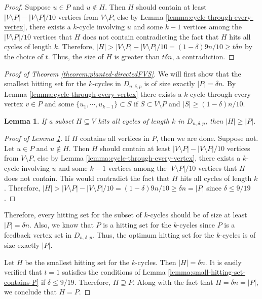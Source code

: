 \documentclass[11pt]{article}
\newtheorem{lemma}[theorem]{Lemma}
\begin{document}
\begin{proof}
Suppose $u\in P$ and $u\not \in H$. Then $H$ should contain at least $|V\setminus P|-|V\setminus P|/10$ vertices from $V\setminus P$, else  by Lemma \ref{lemma:cycle-through-every-vertex}, there exists a $k$-cycle involving $u$ and some $k-1$ vertices among the $|V\setminus P|/10$ vertices that $H$ does not contain contradicting the fact that $H$ hits all cycles of length $k$. Therefore, $|H|>|V\setminus P|-|V\setminus P|/10=(1-\delta)9n/10 \geq t\delta n$ by the choice of $t$. Thus, the size of $H$ is greater than $t\delta n$, a contradiction.
\end{proof}

\begin{proof}[Proof of Theorem \ref{theorem:planted-directedFVS}]
We will first show that the smallest hitting set for the $k$-cycles in $D_{n,\delta,p}$ is of size exactly $|P|=\delta n$.
By Lemma \ref{lemma:cycle-through-every-vertex} there exists a $k$-cycle through every vertex $v\in P$ and some $\{u_1,\cdots,u_{k-1}\}\subset S$ if $S\subset V\setminus P$ and $|S|\geq (1-\delta)n/10$.
\begin{lemma}\label{lemma:lower-bound-HS}
If a subset $H\subseteq V$ hits all cycles of length $k$ in $D_{n,\delta,p}$, then $|H|\geq |P|$.
\end{lemma}
\begin{proof}[Proof of Lemma \ref{lemma:lower-bound-HS}]
If $H$ contains all vertices in $P$, then we are done. Suppose not. Let $u\in P$ and $u\not \in H$. Then $H$ should contain at least $|V\setminus P|-|V\setminus P|/10$ vertices from $V\setminus P$, else by Lemma \ref{lemma:cycle-through-every-vertex}, there exists a $k$-cycle involving $u$ and some $k-1$ vertices among the $|V\setminus P|/10$ vertices that $H$ does not contain. This would contradict the fact that $H$ hits all cycles of length $k$. Therefore, $|H|>|V\setminus P|-|V\setminus P|/10=(1-\delta)9n/10\geq \delta n=|P|$ since $\delta\leq 9/19$.
\end{proof}

Therefore, every hitting set for the subset of $k$-cycles should be of size at least $|P|=\delta n$. Also, we know that $P$ is a hitting set for the $k$-cycles since $P$ is a feedback vertex set in $D_{n,\delta,p}$. Thus, the optimum hitting set for the $k$-cycles is of size exactly $|P|$.

Let $H$ be the smallest hitting set for the $k$-cycles. Then $|H|=\delta n$. It is easily verified that $t=1$ satisfies the conditions of Lemma \ref{lemma:small-hitting-set-contains-P} if $\delta\leq 9/19$. Therefore, $H\supseteq P$. Along with the fact that $H=\delta n =|P|$, we conclude that $H=P$.
\end{proof}
\end{document}

